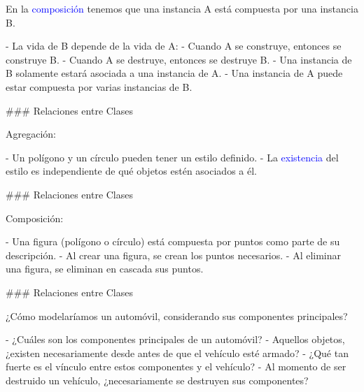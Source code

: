 \vspace{-1em}
\columnsbegin


En la \textcolor{blue}{composición} tenemos que una instancia A está compuesta por una
instancia B.

- La vida de B depende de la vida de A:
    - Cuando A se construye, entonces se construye B.
    - Cuando A se destruye, entonces se destruye B.
    - Una instancia de B solamente estará asociada a una instancia de A.
    - Una instancia de A puede estar compuesta por varias instancias de B.


\centering{}

\columnsend

### Relaciones entre Clases

\newline


\usebox{\umlAgregComp}\par

Agregación:

- Un polígono y un círculo pueden tener un estilo definido.
- La \textcolor{blue}{existencia} del estilo es independiente de
qué objetos estén asociados a él.

### Relaciones entre Clases

\newline

\usebox{\umlAgregComp}\par

Composición:

- Una figura (polígono o círculo) está compuesta por puntos como parte
de su descripción.
- Al crear una figura, se crean los puntos necesarios.
- Al eliminar una figura, se eliminan en cascada sus puntos.

### Relaciones entre Clases

\newline

¿Cómo modelaríamos un automóvil, considerando sus componentes principales?

- ¿Cuáles son los componentes principales de un automóvil?
- Aquellos objetos, ¿existen necesariamente desde antes de que el vehículo
esté armado?
- ¿Qué tan fuerte es el vínculo entre estos componentes y el vehículo?
- Al momento de ser destruido un vehículo, ¿necesariamente se destruyen
sus componentes?

